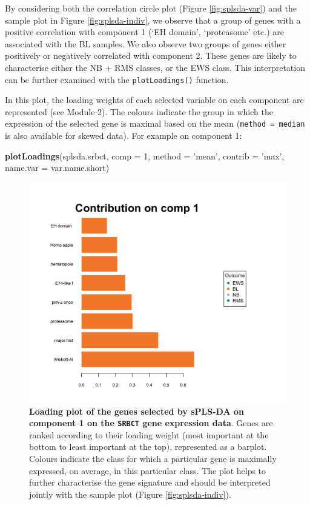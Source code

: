 \documentclass[]{book}
\newenvironment{Shaded}{\begin{snugshade}}{\end{snugshade}}
\newcommand{\DataTypeTok}[1]{\textcolor[rgb]{0.13,0.29,0.53}{#1}}
\newcommand{\DecValTok}[1]{\textcolor[rgb]{0.00,0.00,0.81}{#1}}
\newcommand{\KeywordTok}[1]{\textcolor[rgb]{0.13,0.29,0.53}{\textbf{#1}}}
\newcommand{\NormalTok}[1]{#1}
\newcommand{\StringTok}[1]{\textcolor[rgb]{0.31,0.60,0.02}{#1}}
\begin{document}
By considering both the correlation circle plot (Figure \ref{fig:splsda-var}) and the sample plot in Figure \ref{fig:splsda-indiv}, we observe that a group of genes with a positive correlation with component 1 (`EH domain', `proteasome' etc.) are associated with the BL samples. We also observe two groups of genes either positively or negatively correlated with component 2. These genes are likely to characterise either the NB + RMS classes, or the EWS class. This interpretation can be further examined with the \texttt{plotLoadings()} function.

In this plot, the loading weights of each selected variable on each component are represented (see Module 2). The colours indicate the group in which the expression of the selected gene is maximal based on the mean (\texttt{method\ =\ \textquotesingle{}median\textquotesingle{}} is also available for skewed data). For example on component 1:

\begin{Shaded}
\begin{Highlighting}[]
\KeywordTok{plotLoadings}\NormalTok{(splsda.srbct, }\DataTypeTok{comp =} \DecValTok{1}\NormalTok{, }\DataTypeTok{method =} \StringTok{'mean'}\NormalTok{, }\DataTypeTok{contrib =} \StringTok{'max'}\NormalTok{, }
             \DataTypeTok{name.var =}\NormalTok{ var.name.short)}
\end{Highlighting}
\end{Shaded}

\begin{figure}

{\centering \includegraphics[width=0.5\linewidth]{Figures/PLSDA/splsda-plotloading-1} 

}

\caption{\textbf{Loading plot of the genes selected by sPLS-DA on component 1 on the \texttt{SRBCT} gene expression data}. Genes are ranked according to their loading weight (most important at the bottom to least important at the top), represented as a barplot. Colours indicate the class for which a particular gene is maximally expressed, on average, in this particular class. The plot helps to further characterise the gene signature and should be interpreted jointly with the sample plot (Figure \ref{fig:splsda-indiv}).}\label{fig:splsda-plotloading}
\end{figure}
\end{document}
